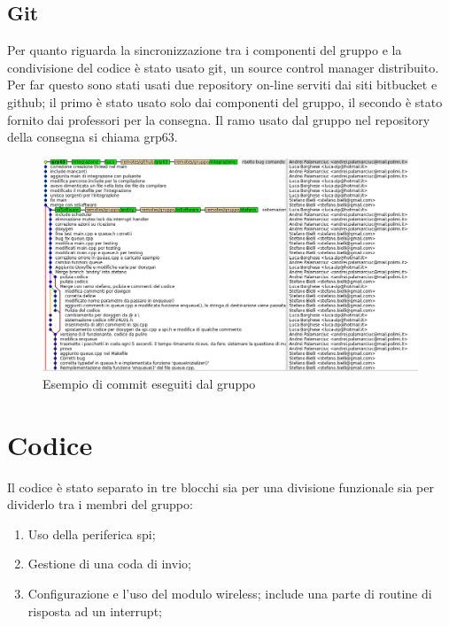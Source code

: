 \section{Git}
Per quanto riguarda la sincronizzazione tra i componenti del gruppo e la condivisione del codice è stato usato git\cite{git}, un source control manager distribuito. Per far questo sono stati usati due repository on-line serviti dai siti bitbucket e github; il primo è stato usato solo dai componenti del gruppo, il secondo è stato fornito dai professori per la consegna. Il ramo usato dal gruppo nel repository della consegna si chiama grp63.
\begin{figure}[htbp]
	\centering
	\includegraphics[width=\textwidth]{figure/git.png}
	\caption{Esempio di commit eseguiti dal gruppo\label{figure:git}}
\end{figure}

\chapter{Codice}
Il codice è stato separato in tre blocchi sia per una divisione funzionale sia per dividerlo tra i membri del gruppo:
\begin{enumerate}
	\item Uso della periferica spi\cite[spi.cpp]{social-wireless};
	\item Gestione di una coda di invio\cite[queue.cpp]{social-wireless};
	\item Configurazione e l'uso del modulo wireless\cite[social-wireless.cpp]{social-wireless}; include una parte di routine di risposta ad un interrupt;
\end{enumerate}

